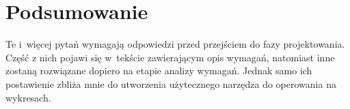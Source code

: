 \documentclass[11pt,twoside,a4paper,final]{llncs}
\begin{document}
\section{Podsumowanie}
Te i~więcej pytań wymagają odpowiedzi przed przejściem do fazy projektowania. Część z nich pojawi się w~tekście zawierającym opis wymagań, natomiast inne zostaną rozwiązane dopiero na etapie analizy wymagań. Jednak samo ich postawienie zbliża mnie do utworzenia użytecznego narzędza do operowania na wykresach.
\end{document}
